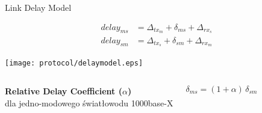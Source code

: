 \documentclass[compress,red]{beamer}
\begin{document}
% 
% 
% 
\begin{frame}{Link Delay Model}

  \begin{align}
    \nonumber delay_{ms} &= \Delta_{tx_m} + \delta_{ms} + \Delta_{rx_s} \\
    \nonumber delay_{sm} &= \Delta_{tx_s} + \delta_{sm} + \Delta_{rx_m}
  \end{align}

   \vspace{0.2cm}

  \begin{center}
  \texttt{[image: protocol/delaymodel.eps]}
  \end{center}

\begin{columns}[c]
  \column{2.8in}

    \begin{center}
      \textbf{Relative Delay Coefficient ($\alpha$)} \\
      dla jedno-modowego światłowodu 1000base-X
    \end{center}

  \column{1.5in}
    \begin{center}
      \begin{equation}
      \nonumber \delta_{ms} = (1 + \alpha) \, \delta_{sm}
      \end{equation}
    \end{center}
    \vspace{0.5cm}
\end{columns}
  

\end{frame}
\end{document}
